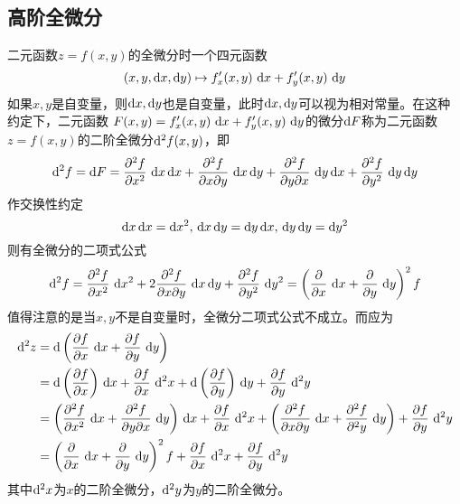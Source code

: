 \subsection{高阶全微分}
二元函数$z=f(x,y)$的全微分时一个四元函数
\[ (x,y,\mathop{}\!\mathrm{d} x,\mathop{}\!\mathrm{d} y)\mapsto f'_x(x,y)\,\mathop{}\!\mathrm{d} x + f'_y(x,y)\,\mathop{}\!\mathrm{d} y \]
如果$x,y$是自变量，则$\mathop{}\!\mathrm{d} x,\mathop{}\!\mathrm{d} y$也是自变量，此时$\mathop{}\!\mathrm{d} x,\mathop{}\!\mathrm{d} y$可以视为相对常量。在这种约定下，二元函数
$F(x,y)=f'_x(x,y)\,\mathop{}\!\mathrm{d} x+ f'_y(x,y)\,\mathop{}\!\mathrm{d} y$的微分$\mathop{}\!\mathrm{d} F$称为二元函数$z=f(x,y)$的二阶全微分$\mathop{}\!\mathrm{d}^2f(x,y)$，即
\begin{equation}
    \diff^2 f
    = \diff F
    = \frac{\partial^2 f}{\partial x^2}\,\diff x\diff x
    + \frac{\partial^2 f}{\partial x\partial y}\,\diff x\diff y
    + \frac{\partial^2 f}{\partial y\partial x}\,\diff y\diff x
    + \frac{\partial^2 f}{\partial y^2}\,\diff y\diff y
\end{equation}
作交换性约定
\[
    \diff x\diff x = \diff x^2,\, \diff x\diff y= \diff y\diff x,\, \diff y\diff y=\diff y^2
\]
则有全微分的二项式公式
\begin{equation}
    \mathop{}\!\mathrm{d}^2 f
    = \frac{\partial^2 f}{\partial x^2}\,\mathop{}\!\mathrm{d} x^2
    + 2\frac{\partial^2 f}{\partial x\partial y}\,\mathop{}\!\mathrm{d} x\mathop{}\!\mathrm{d} y
    + \frac{\partial^2 f}{\partial y^2}\,\mathop{}\!\mathrm{d} y^2
    = \left(\frac{\partial}{\partial x}\,\mathop{}\!\mathrm{d} x + \frac{\partial}{\partial y}\,\mathop{}\!\mathrm{d} y\right)^2 f
\end{equation}
值得注意的是当$x,y$不是自变量时，全微分二项式公式不成立。而应为
\begin{equation}
    \begin{split}
        \diff^2 z
        &= \diff \left(\frac{\partial f}{\partial x}\,\diff x + \frac{\partial f}{\partial y}\,\diff y\right)                    \\
        &= \diff\left(\frac{\partial f}{\partial x}\right)\,\diff x
        + \frac{\partial f}{\partial x}\,\diff^2 x
        + \diff\left(\frac{\partial f}{\partial y}\right)\,\diff y
        + \frac{\partial f}{\partial y}\,\diff^2 y                                                                                 \\
        &= \left(\frac{\partial^2 f}{\partial x^2}\,\diff x + \frac{\partial^2 f}{\partial y\partial x}\,\diff y\right)\,\diff x
        + \frac{\partial f}{\partial x}\,\diff^2 x
        + \left(\frac{\partial^2 f}{\partial x\partial y}\,\diff x + \frac{\partial^2 f}{\partial^2 y}\,\diff y\right)
        + \frac{\partial f}{\partial y}\,\diff^2 y                                                                                 \\
        &= \left(\frac{\partial}{\partial x}\,\diff x + \frac{\partial}{\partial y}\,\diff y\right)^2 f
        + \frac{\partial f}{\partial x}\,\diff^2 x
        + \frac{\partial f}{\partial y}\,\diff^2 y
    \end{split}
\end{equation}
其中$\mathop{}\!\mathrm{d}^2 x$为$x$的二阶全微分，$\mathop{}\!\mathrm{d}^2 y$为$y$的二阶全微分。


